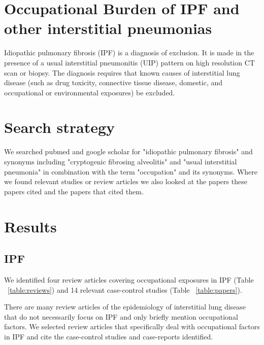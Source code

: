\documentclass[a4paper,12pt]{article}
\author{Carl Reynolds \\
\small National Heart \& Lung Institute, Imperial College London }
\begin{document}



\section*{\centering Occupational Burden of IPF and other interstitial pneumonias}

Idiopathic pulmonary fibrosis (IPF) is a diagnosis of exclusion. It is made in the
presence of a usual interstitial pneumonitis (UIP) pattern on high resolution CT scan
or biopsy. The diagnosis requires that known causes of interstitial lung disease
(such as drug toxicity, connective tissue disease, domestic, and occupational or
environmental exposures) be excluded\cite{Travis2013}.


\section{Search strategy}

We searched pubmed and google scholar for "idiopathic pulmonary fibrosis" and synonyms including "cryptogenic fibrosing alveolitis" and "usual interstitial pneumonia" in combination with the term "occupation" and its synonyms. Where we found relevant studies or review articles we also looked at the papers these papers cited and the papers that cited them. 

\section{Results}

\subsection{IPF}
We identified four review articles covering occupational exposures in IPF (Table ~\ref{table:reviews})\cite{Turner-Warwick1998} and 14 relevant case-control studies (Table ~\ref{table:papers}).

There are many review articles of the epidemiology of interstitial lung disease that do not necessarily focus on IPF and only briefly mention occupational factors. We selected review articles that specifically deal with occupational factors in IPF and cite the case-control studies and case-reports identified.
\end{document}
